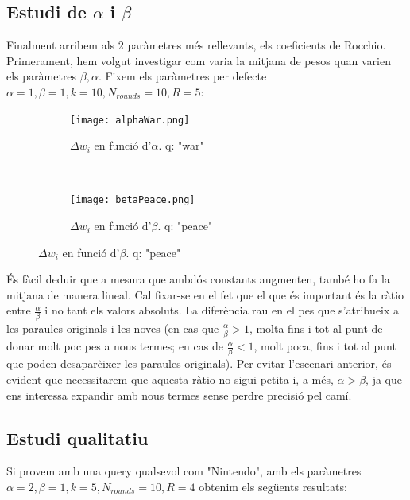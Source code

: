 \documentclass[12pt]{article}
\begin{document}
\subsection{Estudi de $\alpha$ i $\beta$}
Finalment arribem als 2 paràmetres més rellevants, els coeficients de Rocchio. Primerament, hem volgut investigar com varia la mitjana de pesos quan varien els paràmetres $\beta , \alpha$. Fixem els paràmetres per defecte $\alpha = 1, \beta = 1, k = 10, N_{rounds} = 10, R = 5$:

\begin{figure}[h!]
    \centering
    \hspace{-1cm}
    \begin{subfigure}[b]{0.45\textwidth}
        \texttt{[image: alphaWar.png]}
        \caption{$\Delta w_i$ en funció d'$\alpha$. q: "war"}
        \label{fig:K1PPM}
    \end{subfigure}
    ~ %
    \begin{subfigure}[b]{0.45\textwidth}
        \texttt{[image: betaPeace.png]}
        \caption{$\Delta w_i$ en funció d'$\beta$. q: "peace"}
        \label{fig:K2PPM}
    \end{subfigure}
\end{figure}
\FloatBarrier

És fàcil deduir que a mesura que ambdós constants augmenten, també ho fa la mitjana de manera lineal. Cal fixar-se en el fet que el que és important és la ràtio entre $\frac{\alpha}{\beta}$ i no tant els valors absoluts. La diferència rau en el pes que s'atribueix a les paraules originals i les noves (en cas que $\frac{\alpha}{\beta} > 1$, molta fins i tot al punt de donar molt poc pes a nous termes; en cas de $\frac{\alpha}{\beta} < 1$, molt poca, fins i tot al punt que poden desaparèixer les paraules originals). Per evitar l'escenari anterior, és evident que necessitarem que aquesta ràtio no sigui petita i, a més, $\alpha > \beta$, ja que ens interessa expandir amb nous termes sense perdre precisió pel camí.


\subsection{Estudi qualitatiu}

Si provem amb una query qualsevol com "Nintendo", amb els paràmetres $\alpha = 2, \beta = 1, k = 5, N_{rounds} = 10, R = 4$  obtenim els següents resultats:
\\
\end{document}
